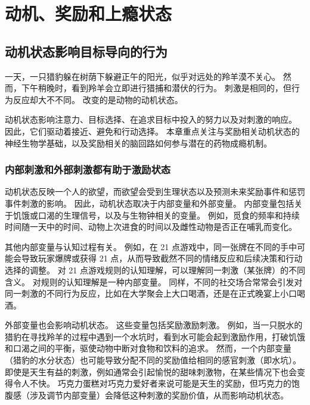 \chapter{动机、奖励和上瘾状态} \label{chap:chap43}

\section{动机状态影响目标导向的行为}

一天，一只猎豹躲在树荫下躲避正午的阳光，似乎对远处的羚羊漠不关心。
然而，下午稍晚时，看到羚羊会立即进行猎捕和潜伏的行为。
刺激是相同的，但行为反应却大不不同。
改变的是动物的动机状态。



动机状态影响注意力、目标选择、在追求目标中投入的努力以及对刺激的响应。
因此，它们驱动着接近、避免和行动选择。
本章重点关注与奖励相关动机状态的神经生物学基础，以及奖励相关的脑回路如何参与潜在的药物成瘾机制。



\subsection{内部刺激和外部刺激都有助于激励状态}

动机状态反映一个人的欲望，而欲望会受到生理状态以及预测未来奖励事件和惩罚事件刺激的影响。
因此，动机状态取决于内部变量和外部变量。
内部变量包括关于饥饿或口渴的生理信号，以及与生物钟相关的变量。
例如，觅食的频率和持续时间随一天中的时间、动物上次进食的时间以及雌性动物是否正在哺乳而变化。


其他内部变量与认知过程有关。
例如，在 21 点游戏中，同一张牌在不同的手中可能会导致玩家爆牌或获得 21 点，从而导致截然不同的情绪反应和后续决策和行动选择的调整。
对 21 点游戏规则的认知理解，可以理解同一刺激（某张牌）的不同含义。
对规则的认知理解是一种内部变量。
同样，不同的社交场合常常会引发对同一刺激的不同行为反应，比如在大学聚会上大口喝酒，还是在正式晚宴上小口喝酒。


外部变量也会影响动机状态。
这些变量包括奖励激励刺激。
例如，当一只脱水的猎豹在寻找羚羊的过程中遇到一个水坑时，看到水可能会起到激励作用，打破饥饿和口渴之间的平衡，驱使动物中断对食物和饮料的追求。
然而，一个内部变量（猎豹的水分状态）也可能导致分配不同的奖励值给相同的感官刺激（即水坑）。
即使是天生有益的刺激，例如通常会引起愉悦的甜味刺激物，在某些情况下也会变得令人不快。
巧克力蛋糕对巧克力爱好者来说可能是天生的奖励，但巧克力的饱腹感（涉及调节内部变量）会降低这种刺激的奖励价值，从而影响动机状态。



